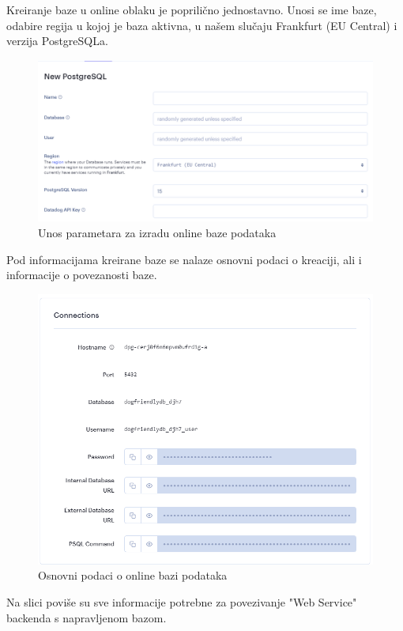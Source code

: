             Kreiranje baze u online oblaku je poprilično jednostavno. Unosi se ime baze, odabire regija u kojoj je baza aktivna, u našem slučaju Frankfurt (EU Central) i verzija PostgreSQLa.
            \begin{figure}[H]
			    \includegraphics[width=\textwidth]{slike/deploy2.png} 
			        \caption{Unos parametara za izradu online baze podataka}
			    \label{fig:Unos parametara za izradu online baze podataka}
		    \end{figure}
            Pod informacijama kreirane baze se nalaze osnovni podaci o kreaciji, ali i informacije o povezanosti baze. 
            \begin{figure}[H]
			    \includegraphics[width=\textwidth]{slike/deploy3.png} 
			        \caption{Osnovni podaci o online bazi podataka}
			    \label{fig:Osnovni podaci o online bazi podataka}
		    \end{figure}
            Na slici poviše su sve informacije potrebne za povezivanje "Web Service" backenda s napravljenom bazom.

